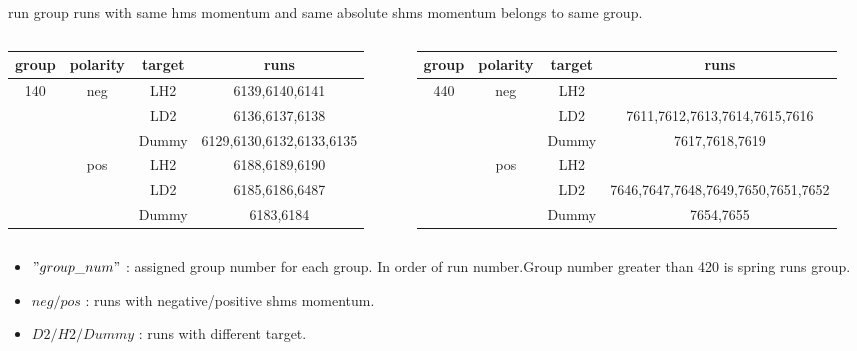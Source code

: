 \documentclass[aspectratio=169,xcolor=dvipsnames]{beamer}
\begin{document}
\begin{frame}{run group}
runs with same hms momentum and same absolute shms momentum belongs to same group.  
\begin{columns}
  \begin{column}[T]{0.5\textwidth}
  \smaller
  \smaller
  \smaller
    \begin{center}
    \begin{tabular}{|c|c|c|c|}
      \hline
      group & polarity & target & runs \\
      \hline
      \multirow{6}{0.8cm}{140} & \multirow{3}{0.8cm}{neg} & LH2 & 6139,6140,6141 \\
      \cline{3-4}
      &   & LD2 & 6136,6137,6138 \\
      \cline{3-4}         
      &    & Dummy & 6129,6130,6132,6133,6135 \\
      \cline{2-4} 
      & \multirow{3}{0.8cm}{pos} & LH2 & 6188,6189,6190 \\
      \cline{3-4}
      &    & LD2 & 6185,6186,6487 \\
      \cline{3-4}
      &    & Dummy & 6183,6184 \\  
    \hline 
    \end{tabular}
   \end{center}
  \end{column}
  \begin{column}[T]{0.5\textwidth}
    \smaller
    \smaller
  \smaller
  \begin{center}
    \begin{tabular}{|c|c|c|c|}
      \hline
      group & polarity & target & runs \\
      \hline
      \multirow{6}{0.8cm}{440} & \multirow{3}{0.8cm}{neg} & LH2 &  \\
      \cline{3-4}
      &   & LD2 & 7611,7612,7613,7614,7615,7616 \\
      \cline{3-4}         
      &    & Dummy & 7617,7618,7619 \\
      \cline{2-4} 
      & \multirow{3}{0.8cm}{pos} & LH2 &  \\
      \cline{3-4}
      &    & LD2 & 7646,7647,7648,7649,7650,7651,7652 \\
      \cline{3-4}
      &    & Dummy & 7654,7655 \\  
    \hline 
    \end{tabular}
   \end{center}
  \end{column}
\end{columns}
\begin{itemize}
    \item $"group\_num"$ : assigned group number for each group. In order of run number.Group number greater than 420 is spring runs group.
    \item $neg/pos$ : runs with negative/positive shms momentum.
    \item $D2/H2/Dummy$ : runs with different target. 
\end{itemize}
\end{frame}
\end{document}

